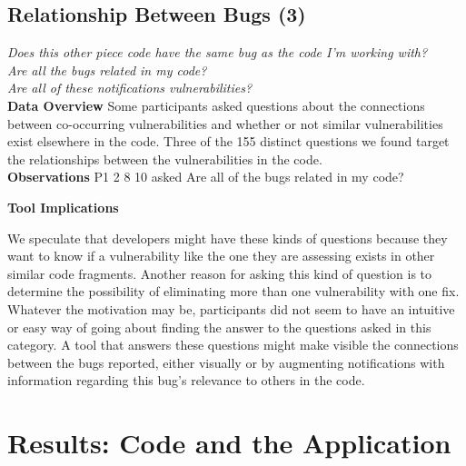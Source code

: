 \documentclass[conference]{IEEEtran}
\begin{document}

\noindent\subsection{\textbf{Relationship Between Bugs (3)}}\label{rbb}

\noindent\emph{Does this other piece code have the same bug as the code I'm working with?} \\
\emph{Are all the bugs related in my code?} \\
\emph{Are all of these notifications vulnerabilities?} \\


\noindent\textbf{Data Overview}
Some participants asked questions about the connections between co-occurring vulnerabilities and whether or not similar vulnerabilities exist elsewhere in the code. 
Three of the 155 distinct questions we found target the relationships between the vulnerabilities in the code. 
\\

\noindent\textbf{Observations}
P1 2 8 10 asked
Are all of the bugs related in my code?

\noindent\textbf{Tool Implications}

We speculate that developers might have these kinds of questions because they want to know if a vulnerability like the one they are assessing exists in other similar code fragments.
Another reason for asking this kind of question is to determine the possibility of eliminating more than one vulnerability with one fix. 
Whatever the motivation may be, participants did not seem to have an intuitive or easy way of going about finding the answer to the questions asked in this category.
A tool that answers these questions might make visible the connections between the bugs reported, either visually or by augmenting notifications with information regarding this bug's relevance to others in the code.



\section{Results: Code and the Application}
\label{sec:results-ca}
\end{document}
